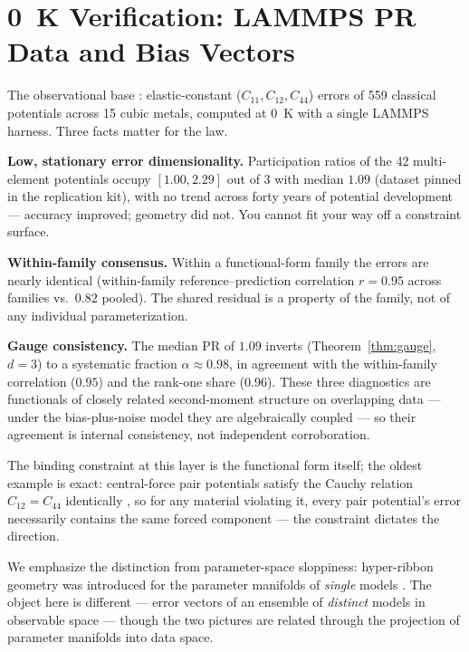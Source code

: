 \documentclass[11pt]{article}
\begin{document}
\section{0~K Verification: LAMMPS PR Data and Bias Vectors}
\label{sec:zerok}

The observational base \citep{welcing2026instance}: elastic-constant
($C_{11}, C_{12}, C_{44}$) errors of 559 classical potentials across 15 cubic
metals, computed at 0~K with a single LAMMPS harness. Three facts matter for
the law.

\textbf{Low, stationary error dimensionality.} Participation ratios of the
42 multi-element potentials occupy $[1.00, 2.29]$ out of 3 with median $1.09$
(dataset pinned in the replication kit), with no trend across forty years of
potential development --- accuracy improved; geometry did not. You cannot fit
your way off a constraint surface.

\textbf{Within-family consensus.} Within a functional-form family the errors are
nearly identical (within-family reference--prediction correlation $r = 0.95$
across families vs.\ $0.82$ pooled). The shared residual is a property of the
family, not of any individual parameterization.

\textbf{Gauge consistency.} The median PR of $1.09$ inverts
(Theorem~\ref{thm:gauge}, $d{=}3$) to a systematic fraction $\alpha \approx 0.98$,
in agreement with the within-family correlation ($0.95$) and the rank-one share
($0.96$). These three diagnostics are functionals of closely related
second-moment structure on overlapping data --- under the bias-plus-noise model
they are algebraically coupled --- so their agreement is internal consistency,
not independent corroboration.

The binding constraint at this layer is the functional form itself; the oldest
example is exact: central-force pair potentials satisfy the Cauchy relation
$C_{12}=C_{44}$ identically \citep{born1954}, so for any material violating
it, every pair potential's error necessarily contains the same forced
component --- the constraint dictates the direction.

We emphasize the distinction from parameter-space sloppiness: hyper-ribbon
geometry was introduced for the parameter manifolds of \emph{single} models
\citep{transtrum2011,machta2013,quinn2023,kurniawan2022}. The object here is
different --- error vectors of an ensemble of \emph{distinct} models in
observable space --- though the two pictures are related through the
projection of parameter manifolds into data space.
\end{document}
